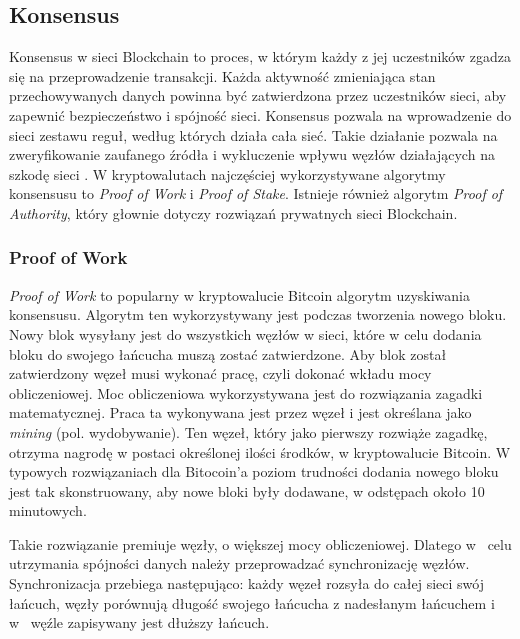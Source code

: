 \documentclass[a4paper,12pt]{book}
\begin{document}
\subsection{Konsensus}

Konsensus w sieci Blockchain to proces, w którym każdy z jej uczestników zgadza się na przeprowadzenie transakcji. Każda aktywność zmieniająca stan przechowywanych danych powinna być zatwierdzona przez uczestników sieci, aby zapewnić bezpieczeństwo i spójność sieci. Konsensus pozwala na wprowadzenie do sieci zestawu reguł, według których działa cała sieć. Takie działanie pozwala na zweryfikowanie zaufanego źródła i wykluczenie wpływu węzłów działających na szkodę sieci \cite{piechk}. W kryptowalutach najczęściej wykorzystywane algorytmy konsensusu to \textit{Proof of Work} i \textit{Proof of Stake}. Istnieje również algorytm \textit{Proof of Authority}, który głownie dotyczy rozwiązań prywatnych sieci Blockchain.

\subsubsection{Proof of Work}

\textit{Proof of Work} to popularny w kryptowalucie Bitcoin algorytm uzyskiwania konsensusu. Algorytm ten wykorzystywany jest podczas tworzenia nowego bloku. Nowy blok wysyłany jest do wszystkich węzłów w sieci, które w celu dodania bloku do swojego łańcucha muszą zostać zatwierdzone. Aby blok został zatwierdzony węzeł musi wykonać pracę, czyli dokonać wkładu mocy obliczeniowej. Moc obliczeniowa wykorzystywana jest do rozwiązania zagadki matematycznej. Praca ta wykonywana jest przez węzeł i jest określana jako \textit{mining} (pol. wydobywanie). Ten węzeł, który jako pierwszy rozwiąże zagadkę, otrzyma nagrodę w postaci określonej ilości środków, w kryptowalucie Bitcoin. W typowych rozwiązaniach dla Bitocoin'a poziom trudności dodania nowego bloku jest tak skonstruowany, aby nowe bloki były dodawane, w odstępach około 10 minutowych\cite{pow-bitcoin}.

Takie rozwiązanie premiuje węzły, o większej mocy obliczeniowej. Dlatego w~ celu utrzymania spójności danych należy przeprowadzać synchronizację węzłów. Synchronizacja przebiega następująco: każdy węzeł rozsyła do całej sieci swój łańcuch, węzły porównują długość swojego łańcucha z nadesłanym łańcuchem i w~ węźle zapisywany jest dłuższy łańcuch.
\end{document}
